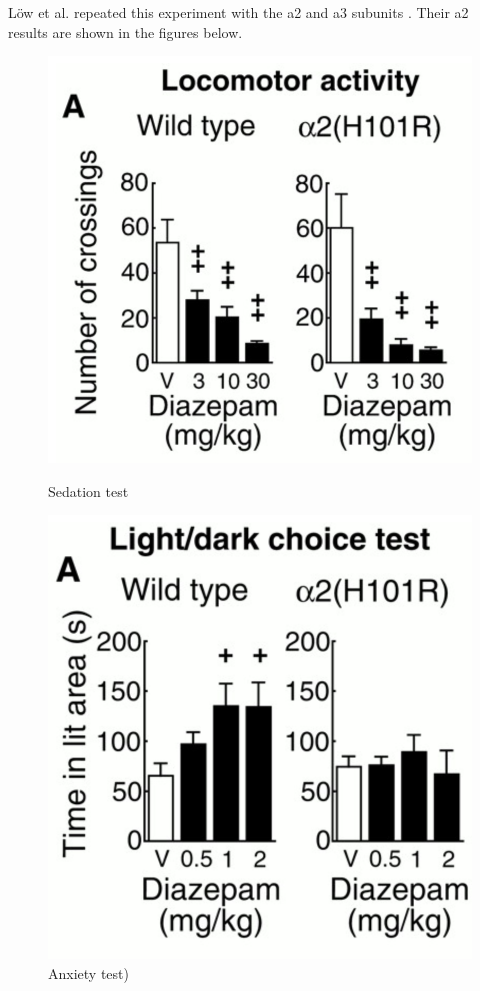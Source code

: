 \documentclass{article}
\begin{document}
\section{}
Löw et al. repeated this experiment with the a2 and a3 subunits \cite{low_molecular_2000}. Their a2 results are shown in the figures below.

\FloatBarrier
\begin{figure}[H]
\centering
\begin{minipage}{.4\textwidth}
  \includegraphics[width=.99\linewidth]{a2_sedation.png}
  \caption{Sedation test}
  \label{fig:test1}
\end{minipage}%
\begin{minipage}{.4\textwidth}
  \centering
  \includegraphics[width=.8\linewidth]{a2_anxiety.png}
  \caption{Anxiety test)}
  \label{fig:test2}
\end{minipage}
\end{figure}
\end{document}
